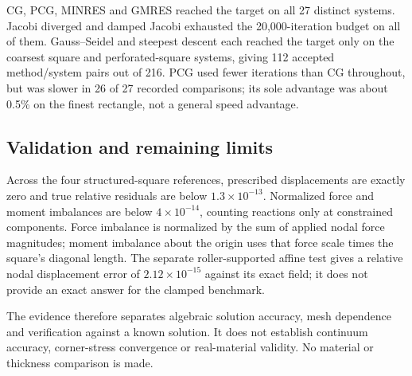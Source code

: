 CG, PCG, MINRES and GMRES reached the target on all 27 distinct systems.
Jacobi diverged and damped Jacobi exhausted the 20,000-iteration budget
on all of them. Gauss--Seidel and steepest descent each reached the target
only on the coarsest square and perforated-square systems, giving 112
accepted method/system pairs out of 216. PCG used fewer iterations than
CG throughout, but was slower in 26 of 27 recorded comparisons;
its sole advantage was about 0.5\% on the finest rectangle, not a
general speed advantage.

\subsection{Validation and remaining limits}
Across the four structured-square references, prescribed displacements are
exactly zero and true relative residuals are below $1.3\times10^{-13}$.
Normalized force and moment imbalances are below $4\times10^{-14}$,
counting reactions only at constrained components. Force imbalance is
normalized by the sum of applied nodal
force magnitudes; moment imbalance about the origin uses that force scale
times the square's diagonal length.  The separate roller-supported affine test gives a
relative nodal displacement error of $2.12\times10^{-15}$ against its
exact field; it does not provide an exact answer for the clamped benchmark.

The evidence therefore separates algebraic solution accuracy, mesh
dependence and verification against a known solution. It does not establish
continuum accuracy, corner-stress convergence or real-material validity.
No material or thickness comparison is made.
